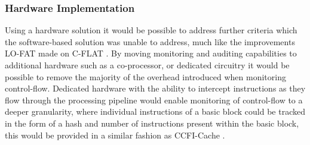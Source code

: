 \subsubsection{Hardware Implementation}
Using a hardware solution it would be possible to address further criteria which the software-based solution was unable to address, much like the improvements LO-FAT\cite{Dessouky2017} made on C-FLAT \cite{Abera2016}. By moving monitoring and auditing capabilities to additional hardware such as a co-processor, or dedicated circuitry it would be possible to remove the majority of the overhead introduced when monitoring control-flow. Dedicated hardware with the ability to intercept instructions as they flow through the processing pipeline would enable monitoring of control-flow to a deeper granularity, where individual instructions of a basic block could be tracked in the form of a hash and number of instructions present within the basic block, this would be provided in a similar fashion as CCFI-Cache \cite{Danger2018}.

